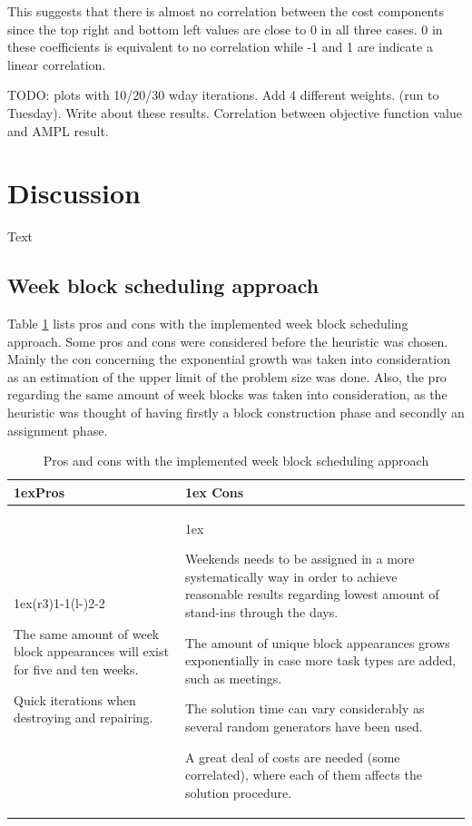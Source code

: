  This suggests that there is almost no correlation between the cost components since the top right and bottom left values are close to 0 in all three cases. 0 in these coefficients is equivalent to no correlation while -1 and 1 are indicate a linear correlation. 
 
TODO: plots with 10/20/30 wday iterations. Add 4 different weights. (run to Tuesday).
Write about these results. Correlation between objective function value and AMPL result.

\section{Discussion}
Text


\subsection{Week block scheduling approach}
Table \ref{pros_cons_weekly_scheduling} lists pros and cons with the implemented week block scheduling approach. Some pros and cons were considered before the heuristic was chosen. Mainly the con concerning the exponential growth was taken into consideration as an estimation of the upper limit of the problem size was done. Also, the pro regarding the same amount of week blocks was taken into consideration, as the heuristic was thought of having firstly a block construction phase and secondly an assignment phase. 

\begin{table}[!h]
\caption{Pros and cons with the implemented week block scheduling approach}
\label{pros_cons_weekly_scheduling}
\begin{tabularx}{\linewidth}{>{\parskip1ex}X@{\kern4\tabcolsep}>{\parskip1ex}X}
\toprule
\hfil\bfseries Pros
&
\hfil\bfseries Cons
\\\cmidrule(r{3\tabcolsep}){1-1}\cmidrule(l{-\tabcolsep}){2-2}

The same amount of week block appearances will exist for five and ten weeks.\par
Quick iterations when destroying and repairing.\par

&

Weekends needs to be assigned in a more systematically way in order to achieve reasonable results regarding lowest amount of stand-ins through the days.\par
The amount of unique block appearances grows exponentially in case more task types are added, such as meetings.\par
The solution time can vary considerably as several random generators have been used.\par
A great deal of costs are needed (some correlated), where each of them affects the solution procedure.

\\\bottomrule
\end{tabularx}
\end{table}

